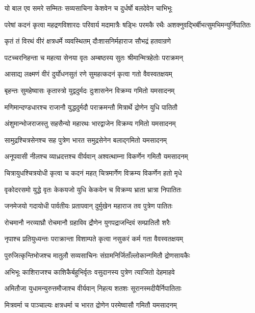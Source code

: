 \twolineshloka
{यो बाल एव समरे सम्मितः सव्यसाचिना}
{केशवेन च दुर्धर्षो बलदेवेन चाभिभूः}


\threelineshloka
{परेषां कदनं कृत्वा महद्रणविशारदः}
{परिवार्य मदामात्रैः षड्भिः परमकै रथैः}
{अशक्नुवद्भिर्बीभत्सुमभिमन्युर्निपातितः}


\twolineshloka
{कृतं तं विरथं वीरं क्षत्रधर्मे व्यवस्थितम्}
{दौःशासनिर्महाराज सौभद्रं हतवान्रणे}


\twolineshloka
{पटच्चरनिहन्ता च महत्या सेनया वृतः}
{अम्बष्ठस्य सुतः श्रीमान्मित्रहेतोः पराक्रमन्}


\twolineshloka
{आसाद्य लक्ष्मणं वीरं दुर्योधनसुतं रणे}
{सुमहत्कदनं कृत्वा गतो वैवस्वतक्षयम्}


\twolineshloka
{बृहन्तः सुमहेष्वासः कृतास्त्रो युद्वदुर्मदः}
{दुःशासनेन विक्रम्य गमितो यमसादनम्}


\twolineshloka
{मणिमान्दण्डधारश्च राजानौ युद्धदुर्मदौ}
{पराक्रमन्तौ मित्रार्थे द्रोणेन युधि पातितौ}


\twolineshloka
{अंशुमान्भोजराजस्तु सहसैन्यो महारथः}
{भारद्वाजेन विक्रम्य गमितो यमसादनम्}


\twolineshloka
{सामुद्रश्चित्रसेनश्च सह पुत्रेण भारत}
{समुद्रसेनेन बलाद्गमितो यमसादनम्}


\twolineshloka
{अनूपवासी नीलश्च व्याध्रदत्तश्च वीर्यवान्}
{अश्वत्थाम्ना विकर्णेन गमितौ यमसादनम्}


\threelineshloka
{चित्रायुधश्चित्रयोधी कृत्वा च कदनं महत्}
{चित्रमार्गेण विक्रम्य विकर्णेन हतो मृधे}
{}


\twolineshloka
{वृकोदरसमो युद्धे वृतः केकयजो युधि}
{केकयेन च विक्रम्य भ्राता भ्रात्रा निपातितः}


\twolineshloka
{जनमेजयो गदायोधी पार्वतीयः प्रतापवान्}
{दुर्मुखेन महाराज तव पुत्रेण पातितः}


\twolineshloka
{रोचमानौ नरव्याघ्रौ रोचमानौ ग्रहाविव}
{द्रौणेन युगपद्राजन्दिवं सम्प्रातितौ शरैः}


\twolineshloka
{नृपाश्च प्रतियुध्यन्तः पराक्रान्ता विशाम्पते}
{कृत्वा नसुकरं कर्म गता वैवस्वतक्षयम्}


\twolineshloka
{पुरुजित्कृन्तिभोजश्च मातुलौ सव्यसाचिनः}
{संग्रामनिर्जिताँल्लोकान्गमितौ द्रोणसायकैः}


\twolineshloka
{अभिभूः काशिराजश्च काशिकैर्बहुभिर्वृतः}
{वसुदानस्य पुत्रेण त्याजितो देहमाहवे}


\twolineshloka
{अमितौजा युधामन्युरुत्तमौजाश्च वीर्यवान्}
{निहत्य शतशः सूरानस्मदीयैर्निपातिताः}


\twolineshloka
{मित्रवर्मा च पाञ्चाल्यः क्षत्रधर्मा च भारत}
{द्रोणेन परमेष्वासौ गमितौ यमसादनम्}


